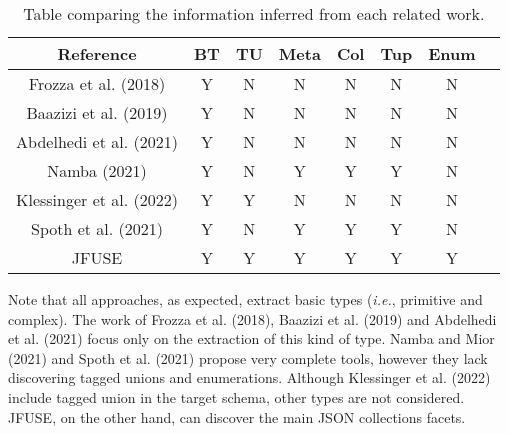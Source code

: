 \begin{table*}
\caption{Table comparing the information inferred from each related work.}

\centering
\small
\begin{tabular}{|c|c|c|c|c|c|c|c|} 
\hline
\textbf{Reference}   & \textbf{BT} & \textbf{TU} & \textbf{Meta} & \textbf{Col} & \textbf{Tup} & \textbf{Enum}  \\ 
\hline
Frozza et al. (2018)     & Y                     & N                      & N                                  & N                               & N                              & N                     \\ 
\hline
Baazizi et al. (2019)     & Y                     & N                      & N                                  & N                               & N                         & N                     \\ 
\hline
Abdelhedi et al. (2021)          & Y                     & N                      & N                                  & N                               & N                                  & N                     \\ 
\hline
Namba (2021)     & Y                     & N                      & Y                                  & Y                               & Y                                        & N                     \\ 
\hline
Klessinger et al. (2022) & Y                     & Y                      & N                                  & N                               & N                         & N                      \\ 
\hline
Spoth et al. (2021)      & Y                     & N                      & Y                                  & Y                               & Y                                           & N                     \\ 
\hline
JFUSE & Y                     & Y                      & Y                                  & Y                               & Y                                               & Y                     \\
\hline
\end{tabular}
\label{tab:Compara}
\end{table*}

Note that all approaches, as expected, extract basic types (\textit{i.e.}, primitive and complex). The work of Frozza et al. (2018), Baazizi et al. (2019) and Abdelhedi et al. (2021) focus only on the extraction of this kind of type. Namba and Mior (2021) and Spoth et al. (2021) propose very complete tools, however they lack discovering tagged unions and enumerations. Although Klessinger et al. (2022) include tagged union in the target schema, other types are not considered. JFUSE, on the other hand, can discover the main JSON collections facets. 


